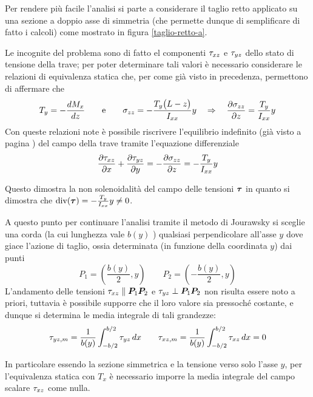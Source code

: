 		Per rendere più facile l'analisi si parte a considerare il taglio retto applicato su una sezione a doppio asse di simmetria (che permette dunque di semplificare di fatto i calcoli) come mostrato in figura \ref{taglio-retto-a}.
		
		
		Le incognite del problema sono di fatto el componenti $\tau_{xz}$ e $\tau_{yz}$ dello stato di tensione della trave; per poter determinare tali valori è necessario considerare le relazioni di equivalenza statica che, per come già visto in precedenza, permettono di affermare che
		\[ T_y = - \frac{dM_x}{dz} \qquad \textrm e \qquad  \sigma_{zz} = -\frac{T_y\big(L-z\big)}{I_{xx}}y \quad \Rightarrow \quad \frac{\partial \sigma_{zz}}{\partial z} = \frac {T_y}{I_{xx}} y\]
		Con queste relazioni note è possibile riscrivere l'equilibrio indefinito (già visto a pagina \pageref{sec:sv:equilibrioindefinito}) del campo della trave tramite l'equazione differenziale
		\begin{equation} \label{eq:taglio:temp1}
			\frac{\partial \tau_{xz}}{\partial x} + \frac{\partial \tau_{yz}}{\partial y} = -\frac{\partial \sigma_{zz}}{\partial z} = - \frac {T_y} {I_{xx}} y
		\end{equation}
		\begin{nota}
			Questo dimostra la non solenoidalità del campo delle tensioni $\boldsymbol{\tau}$ in quanto si dimostra che $\textrm{div}(\boldsymbol{\tau}) =- \frac {T_y} {I_{xx}} y \neq 0$.
		\end{nota}
		
		A questo punto per continuare l'analisi tramite il metodo di Jourawsky si sceglie una corda (la cui lunghezza vale $b(y)$ ) qualsiasi perpendicolare all'asse $y$ dove giace l'azione di taglio, ossia determinata (in funzione della coordinata $y$) dai punti
		\[ P_1 = \left(\frac{b(y)}{2}, y\right) \qquad P_2 = \left(-\frac{b(y)}{2}, y\right) \]
		L'andamento delle tensioni $\tau_{xz} \parallel \boldsymbol{P}_1\boldsymbol{P}_2$ e $\tau_{yz} \perp \boldsymbol{P}_1\boldsymbol{P}_2$ non risulta essere noto a priori, tuttavia è possibile supporre che il loro valore sia pressoché costante, e dunque si determina le media integrale di tali grandezze:
		\[ \tau_{yz,m}= \frac 1 {b(y)} \int_{-b/2}^{b/2} \tau_{yz} \, dx \qquad \tau_{xz,m}= \frac 1 {b(y)} \int_{-b/2}^{b/2} \tau_{xz} \, dx = 0  \]
		
		In particolare essendo la sezione simmetrica e la tensione verso solo l'asse $y$, per l'equivalenza statica con $T_x$ è necessario imporre la media integrale del campo scalare $\tau_{xz}$ come nulla.
		
